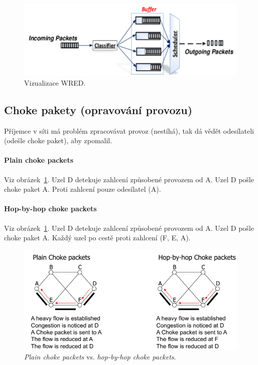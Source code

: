 \begin{figure}[H]
    \centering
    \includegraphics[width=1\linewidth]{wred.png}
    \caption{Vizualizace WRED.}
\end{figure}

\subsection{Choke pakety (opravování provozu)}

Příjemce v síti má problém zpracovávat provoz (nestíhá), tak dá vědět odesílateli (odešle choke paket), aby zpomalil.

\paragraph*{Plain choke packets} Viz obrázek~\ref{pds_choke_packets}. Uzel D detekuje zahlcení způsobené provozem od A. Uzel D pošle choke paket A. Proti zahlcení  pouze odesílatel (A).

\paragraph*{Hop-by-hop choke packets} Viz obrázek~\ref{pds_choke_packets}. Uzel D detekuje zahlcení způsobené provozem od A. Uzel D pošle choke paket A. Každý uzel po cestě  proti zahlcení (F, E, A).

\begin{figure}[H]
    \centering
    \includegraphics[width=1\linewidth]{choke_packets.png}
    \caption{\textit{Plain choke packets} vs. \textit{hop-by-hop choke packets}.}
    \label{pds_choke_packets}
\end{figure}

